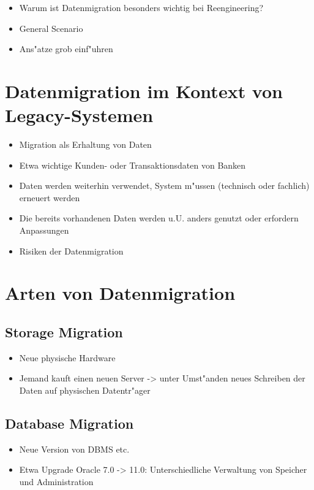 \documentclass[11pt]{scrartcl}
\begin{document}
\begin{itemize}
	\item Warum ist Datenmigration besonders wichtig bei Reengineering?
	\item General Scenario
	\item Ans"atze grob einf"uhren
\end{itemize}

\section{Datenmigration im Kontext von Legacy-Systemen}


\begin{itemize}
	\item Migration als Erhaltung von Daten
	\item Etwa wichtige Kunden- oder Transaktionsdaten von Banken
	\item Daten werden weiterhin verwendet, System m"ussen (technisch oder fachlich) erneuert werden
	\item Die bereits vorhandenen Daten werden u.U. anders genutzt oder erfordern Anpassungen
	\item Risiken der Datenmigration
\end{itemize}

\section{Arten von Datenmigration}

\subsection{Storage Migration}

\begin{itemize}
	\item Neue physische Hardware
	\item Jemand kauft einen neuen Server -> unter Umst"anden neues Schreiben der Daten auf physischen Datentr"ager
\end{itemize}

\subsection{Database Migration}

\begin{itemize}
	\item Neue Version von DBMS etc.
	\item Etwa Upgrade Oracle 7.0 -> 11.0: Unterschiedliche Verwaltung von Speicher und Administration
\end{itemize}
\end{document}

